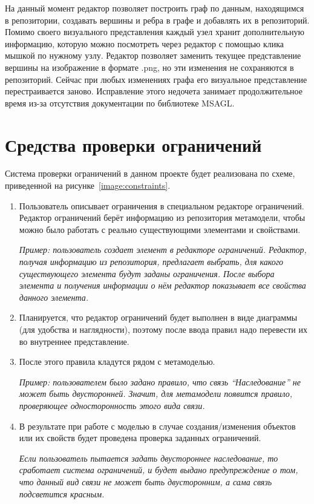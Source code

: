 \documentclass{spisok-article}
\begin{document}
На данный момент редактор позволяет построить граф по данным, находящимся в репозитории, создавать вершины и ребра в графе и добавлять их в репозиторий. Помимо своего визуального представления каждый узел хранит дополнительную информацию, которую можно посмотреть через редактор с помощью клика мышкой по нужному узлу. Редактор позволяет заменить текущее представление вершины на изображение в формате .png, но эти изменения не сохраняются в репозиторий. Сейчас при любых изменениях графа его визуальное представление перестраивается заново. Исправление этого недочета занимает продолжительное время из-за отсутствия документации по библиотеке MSAGL.

\section{Средства проверки ограничений}

Система проверки ограничений в данном проекте будет реализована по схеме, приведенной на рисунке~\ref{image:constraints}.

\begin{enumerate}
	\item Пользователь описывает ограничения в специальном редакторе ограничений. Редактор ограничений берёт информацию из  репозитория метамодели, чтобы можно было работать с реально существующими элементами и свойствами.

		\textit{Пример: пользователь создает элемент в редакторе ограничений. Редактор, получая информацию из репозитория, предлагает выбрать, для какого существующего элемента будут заданы ограничения. После выбора элемента и получения информации о нём редактор показывает все свойства данного элемента.}
	
	\item Планируется, что редактор ограничений будет выполнен в виде диаграммы (для удобства и наглядности), поэтому после ввода правил надо перевести их во внутреннее представление.

	\item После этого правила кладутся рядом с метамоделью.

		\textit{Пример: пользователем было задано правило, что связь ``Наследование'' не может быть двусторонней. Значит, для метамодели появится правило, проверяющее односторонность этого вида связи.}

	\item В результате при работе с моделью в случае создания/изменения объектов или их свойств будет проведена проверка заданных ограничений.

		\textit{Если пользователь пытается задать двустороннее наследование, то сработает система ограничений, и будет выдано предупреждение о том, что данный вид связи не может быть двусторонним, а сама связь подсветится красным.}
\end{enumerate}
\end{document}
